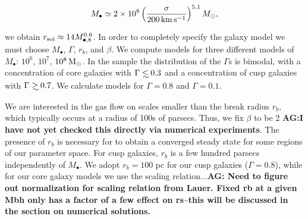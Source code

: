 \documentclass[usenatbib,fleqn]{mn2e}
\newcommand\lsim{\mathrel{\rlap{\lower4pt\hbox{\hskip1pt$\sim$}}
    \raise1pt\hbox{$<$}}}
\newcommand\gsim{\mathrel{\rlap{\lower4pt\hbox{\hskip1pt$\sim$}}
    \raise1pt\hbox{$>$}}}
\newcommand{\rb}{r_b}
\newcommand{\Mbh}[1][]{M_{\bullet#1}}
\newcommand{\soi}{\rm soi}
\newcommand{\rsoi}{r_{\soi}}
\begin{document}
 \begin{align}
M_{\bullet} \simeq 2\times 10^{8}\left(\frac{\sigma}{200\,{\rm
      km\,s^{-1}}}\right)^{5.1}M_{\odot}, 
\label{eq:Msigma}
\end{align}

we obtain $\rsoi \approx 14 M_{\bullet,8}^{0.6}$. In order to
completely specify the galaxy model we must choose $\Mbh$, $\Gamma$, $r_b$,
and $\beta$. We compute models for three different models of
$\Mbh$: $10^6$, $10^7$, $10^8 \,{\rm M_\odot}$. In the
\citealt{LauerFaber+:2007a} sample the distribution of the $\Gamma$s
is bimodal, with a concentration of core galaxies with $\Gamma \lsim
0.3$ and a concentration of cusp galaxies with $\Gamma \gsim
0.7$. We calculate models for $\Gamma=0.8$ and $\Gamma=0.1$. 

We are interested in the gas flow on scales smaller than
the break radius $\rb$, which typically occurs at a radius of 100s of
parsecs. Thus, we fix $\beta$ to be 2 {\bf AG:I have not yet checked this
  directly via numerical experiments}.  The presence of $\rb$ is 
necessary for to obtain a converged steady state for some regions of
our parameter space. For cusp galaxies, $r_b$ is a few hundred parsecs
independently of $\Mbh$. We adopt $\rb=100$ pc for our cusp
galaxies ($\Gamma=0.8$), while for our core galaxy models we use the
scaling relation...{\bf AG: Need to figure out normalization for
  scaling relation from Lauer. Fixed rb at a given Mbh only has a
  factor of a few effect on rs--this will be discussed in the section
  on numerical solutions.}



\end{document}
